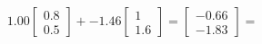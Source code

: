 \documentclass[preview]{standalone}
\begin{document}
\begin{align*}
1.00 \begin{bmatrix} 0.8 \\ 0.5 \end{bmatrix} + -1.46 \begin{bmatrix} 1 \\ 1.6 \end{bmatrix} = \begin{bmatrix} -0.66 \\ -1.83 \end{bmatrix} =
\end{align*}
\end{document}
